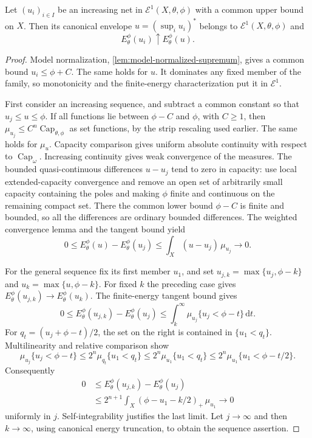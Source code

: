 \begin{proposition}\label{prop:relative-energy-increasing-continuity}
Let $(u_i)_{i\in I}$ be an increasing net in $\mathcal E^1(X,\theta,\phi)$ with a common upper bound on $X$. Then its canonical envelope $u=(\sup_i u_i)^*$ belongs to $\mathcal E^1(X,\theta,\phi)$ and
\[
 E_\theta^\phi(u_i)\uparrow E_\theta^\phi(u).
\]
\end{proposition}
\begin{proof}
Model normalization, \cref{lem:model-normalized-supremum}, gives a common bound $u_i\leq\phi+C$. The same holds for $u$. It dominates any fixed member of the family, so monotonicity and the finite-energy characterization put it in $\mathcal E^1$.

First consider an increasing sequence, and subtract a common constant so that $u_j\leq u\leq\phi$. If all functions lie between $\phi-C$ and $\phi$, with $C\geq1$, then
$\mu_{u_j}\leq C^n\operatorname{Cap}_{\theta,\phi}$ as set functions, by the strip rescaling used earlier. The same holds for $\mu_u$. Capacity comparison gives uniform absolute continuity with respect to $\operatorname{Cap}_\omega$. Increasing continuity gives weak convergence of the measures. The bounded quasi-continuous differences $u-u_j$ tend to zero in capacity: use local extended-capacity convergence and remove an open set of arbitrarily small capacity containing the poles and making $\phi$ finite and continuous on the remaining compact set. There the common lower bound $\phi-C$ is finite and bounded, so all the differences are ordinary bounded differences. The weighted convergence lemma and the tangent bound yield
\[
 0\leq E_\theta^\phi(u)-E_\theta^\phi(u_j)
                  \leq\int_X(u-u_j)\,\mu_{u_j}\longrightarrow0.
\]

For the general sequence fix its first member $u_1$, and set $u_{j,k}=\max\{u_j,\phi-k\}$ and $u_k=\max\{u,\phi-k\}$. For fixed $k$ the preceding case gives $E_\theta^\phi(u_{j,k})\to E_\theta^\phi(u_k)$. The finite-energy tangent bound gives
\[
 0\leq E_\theta^\phi(u_{j,k})-E_\theta^\phi(u_j)
       \leq\int_k^\infty\mu_{u_j}\{u_j<\phi-t\}\,\mathrm dt.
\]
For $q_t=(u_j+\phi-t)/2$, the set on the right is contained in $\{u_1<q_t\}$. Multilinearity and relative comparison show
\[
 \mu_{u_j}\{u_j<\phi-t\}
 \leq2^n\mu_{q_t}\{u_1<q_t\}
 \leq2^n\mu_{u_1}\{u_1<q_t\}
 \leq2^n\mu_{u_1}\{u_1<\phi-t/2\}.
\]
Consequently
\begin{equation}\label{eq:relative-energy-uniform-truncation-error}
 \begin{aligned}
 0&\leq E_\theta^\phi(u_{j,k})-E_\theta^\phi(u_j)\\
  &\leq2^{n+1}\int_X(\phi-u_1-k/2)_+\,\mu_{u_1}\longrightarrow0
 \end{aligned}
\end{equation}
uniformly in $j$. Self-integrability justifies the last limit. Let $j\to\infty$ and then $k\to\infty$, using canonical energy truncation, to obtain the sequence assertion.


\end{proof}
